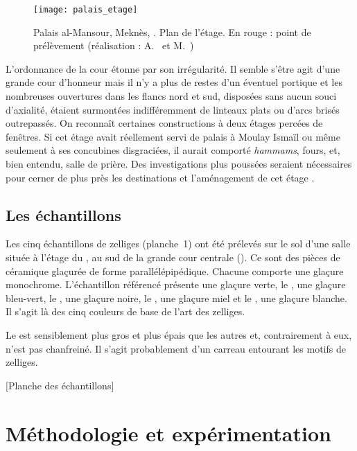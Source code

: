 \begin{figure}[htb]
  \texttt{[image: palais\_etage]}
  \caption{Palais al-Mansour, Meknès, . 
           Plan de l'étage. En rouge : point de prélèvement 
           (réalisation : A.~ et M.~)}
  \label{fig:etage}
\end{figure}

L'ordonnance de la cour étonne par son irrégularité. Il semble s'être 
agit d'une grande cour d'honneur mais il n'y a plus de restes d'un 
éventuel portique et les nombreuses ouvertures dans les flancs nord 
et sud, disposées sans aucun souci d'axialité, étaient surmontées 
indifféremment de linteaux plats ou d'arcs brisés outrepassés. On 
reconnaît certaines constructions à deux étages percées de fenêtres. 
Si cet étage avait réellement servi de palais à Moulay Ismaïl ou 
même seulement à ses concubines disgraciées, il aurait comporté 
\emph{hammams}, fours, et, bien entendu, salle de prière. 
Des investigations plus poussées seraient nécessaires pour cerner 
de plus près les destinations et l'aménagement de cet étage 
\autocite{Barrucand_1976}.

\section{Les échantillons}

Les cinq échantillons de zelliges (planche~1) ont été prélevés sur 
le sol d'une salle située à l'étage du \PaM, au sud de la grande cour 
centrale (). Ce sont des pièces de céramique glaçurée 
de forme parallélépipédique. Chacune comporte une glaçure monochrome. 
L'échantillon référencé  présente une glaçure verte, le 
, une glaçure bleu-vert, le , une glaçure noire, 
le , une glaçure miel et le , une glaçure blanche. 
Il s'agit là des cinq couleurs de base de l'art des zelliges.

Le  est sensiblement plus gros et plus épais que les autres 
et, contrairement à eux, n'est pas chanfreiné. Il s'agit probablement 
d'un carreau entourant les motifs de zelliges.


[Planche des échantillons]


\chapter{Méthodologie et expérimentation}


